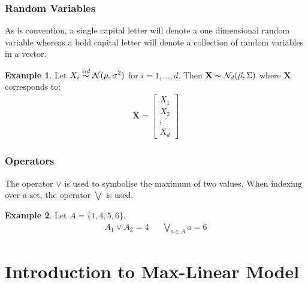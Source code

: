 \documentclass[12pt]{article}
\newcommand{\ds}{\displaystyle}
\theoremstyle{definition}
\theoremstyle{definition}
\newtheorem{example}{Example}[section]
\begin{document}
\subsubsection{Random Variables}
As is convention, a single capital letter will denote a one dimensional random variable whereas a bold capital letter will denote a collection of random variables in a vector.
\begin{example}
Let $\ds X_i \overset{\tiny{iid}}{\thicksim} \mathcal{N}(\mu,\sigma^2)$ for $i=1, \hdots, d$. Then $\mathbf{X}\thicksim \mathcal{N}_d(\vec{\mu}, \Sigma)$ where $\mathbf{X}$ corresponds to:
\begin{align*}
    \mathbf{X}=\begin{bmatrix}X_1\\ X_2 \\ \vdots \\ X_d
    \end{bmatrix}
\end{align*}
\end{example}
\subsubsection{Operators}
The operator $\vee$ is used to symbolise the maximum of two values. When indexing over a set, the operator $\bigvee$ is used.
\begin{example}
Let $A=\{1,4,5,6\}$.
\begin{align*}
    A_1\vee A_2=4 && \bigvee_{a \in A}a=6 
\end{align*}
\end{example}
\pagebreak
\section{Introduction to Max-Linear Model}
\end{document}
